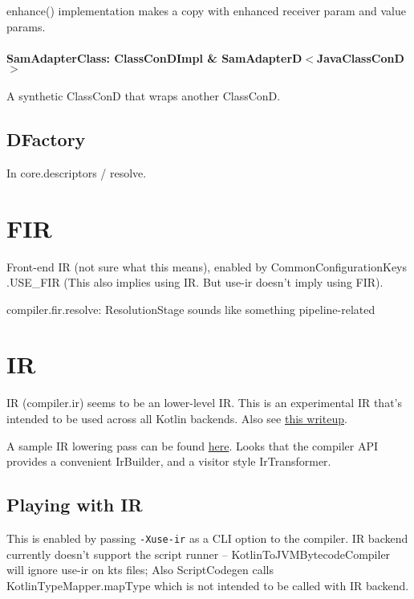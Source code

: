 \documentclass{article}
\begin{document}
enhance() implementation makes a copy with enhanced receiver param and value params.

\paragraph{SamAdapterClass: ClassConDImpl \& SamAdapterD$<$JavaClassConD$>$}
A synthetic ClassConD that wraps another ClassConD.

\subsection{DFactory}

In core.descriptors / resolve.

\section{FIR}
\label{sec:fir}

Front-end IR (not sure what this means), enabled by CommonConfigurationKeys .USE\_FIR (This also implies using IR. But use-ir doesn't imply using FIR).

compiler.fir.resolve: ResolutionStage sounds like something pipeline-related

\section{IR}
\label{sec:ir}

IR (compiler.ir) seems to be an lower-level IR. This is an experimental IR that's intended to be used across all Kotlin backends. Also see \href{https://medium.com/@bnorm/exploring-kotlin-ir-bed8df167c23}{this writeup}.

A sample IR lowering pass can be found \href{https://github.com/JetBrains/kotlin/blob/936e53d/compiler/ir/backend.common/src/org/jetbrains/kotlin/backend/common/lower/TailrecLowering.kt}{here}. Looks that the compiler API provides a convenient IrBuilder, and a visitor style IrTransformer.

\subsection{Playing with IR}
This is enabled by passing \texttt{-Xuse-ir} as a CLI option to the compiler. IR backend currently doesn't support the script runner -- KotlinToJVMBytecodeCompiler will ignore use-ir on kts files; Also ScriptCodegen calls KotlinTypeMapper.mapType which is not intended to be called with IR backend.
\end{document}
